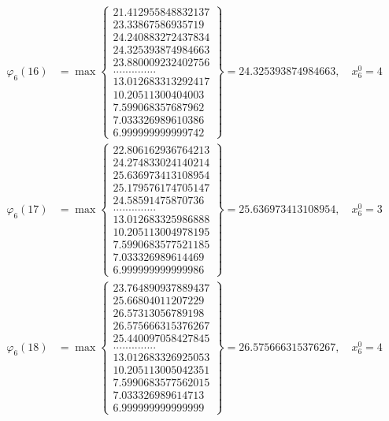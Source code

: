 \documentclass{article}
\begin{document}
\begin{align*}
  
  
  
\varphi_{6}(16) &= \max \left\{ \begin{array}{c}
21.412955848832137 \\
 23.33867586935719 \\
 24.240883272437834 \\
 24.325393874984663 \\
 23.880009232402756 \\
 .............. \\
 13.012683313292417 \\
 10.20511300404003 \\
 7.599068357687962 \\
 7.033326989610386 \\
 6.999999999999742
\end{array} \right\} = 24.325393874984663, \quad x_{6}^0 = 4\\
  
  
  
  
\varphi_{6}(17) &= \max \left\{ \begin{array}{c}
22.806162936764213 \\
 24.274833024140214 \\
 25.636973413108954 \\
 25.179576174705147 \\
 24.58591475870736 \\
 .............. \\
 13.012683325986888 \\
 10.205113004978195 \\
 7.5990683577521185 \\
 7.033326989614469 \\
 6.999999999999986
\end{array} \right\} = 25.636973413108954, \quad x_{6}^0 = 3\\
  
  
  
  
\varphi_{6}(18) &= \max \left\{ \begin{array}{c}
23.764890937889437 \\
 25.66804011207229 \\
 26.57313056789198 \\
 26.575666315376267 \\
 25.440097058427845 \\
 .............. \\
 13.012683326925053 \\
 10.205113005042351 \\
 7.5990683577562015 \\
 7.033326989614713 \\
 6.999999999999999
\end{array} \right\} = 26.575666315376267, \quad x_{6}^0 = 4\\
  

\end{align*}
\end{document}

